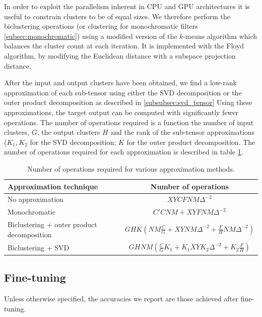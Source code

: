 In order to exploit the parallelism inherent in CPU and GPU
architectures it is useful to constrain clusters to be of equal sizes.
We therefore perform the biclustering operations (or clustering 
for monochromatic filters \ref{subsec:monochromatic}) using a modified
version of the $k$-means algorithm which balances the cluster count at
each iteration. 
It is implemented with the Floyd algorithm, by modifying the Euclidean distance
with a subspace projection distance.

After the input and output clusters have been obtained, we find a low-rank approximation of each 
sub-tensor using either the SVD decomposition or the outer product decomposition as described in \ref{subsubsec:svd_tensor}   
Using these approximations, the target
output can be computed with significantly fewer operations. The number
of operations required is a function the number
of input clusters, $G$, the output clusters $H$ and the rank of the sub-tensor 
approximations ($K_1, K_2$ for the SVD decomposition; $K$ for the outer product decomposition.  
The number of operations required for each approximation is described in table \ref{table:ops}.


\begin{table}[t]
\tiny
\centering
\begin{tabular}{lc}
\hline
Approximation technique & Number of operations \\
\hline
No approximation & $X Y C F N M \Delta^{-2}$\\
Monochromatic & $C' C N M + X Y F N M \Delta^{-2}$\\
Biclustering + outer product decomposition & $G H K (N M \frac{C}{G} + X Y N M \Delta^{-2} + \frac{F}{H} N M \Delta^{-2})$ \\  
Biclustering + SVD & $G H N M (\frac{C}{G}K_1 + K_1 X Y K_2 \Delta^{-2} + K_2\frac{F}{H})$\\
\end{tabular}
\caption{Number of operations required for various approximation methods.} 
\label{table:ops}
\end{table}

\subsection{Fine-tuning}
Unless otherwise specified, the accuracies we report are those achieved after fine-tuning.
%
%
%





